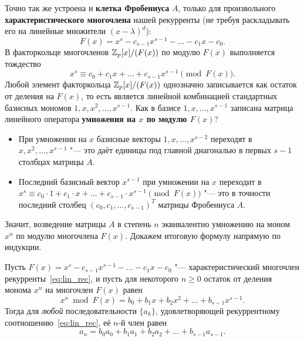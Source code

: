 Точно так же устроена и \textbf{клетка Фробениуса} $A$, только для произвольного \textbf{характеристического многочлена} нашей рекурренты (не требуя раскладывать его на линейные множители $(x - \lambda)^d$):
\[
    F(x) = x^s - c_{s-1} x^{s-1} - \dots - c_1 x - c_0.
\]
В факторкольце многочленов $\mathbb{Z}_p[x] / (F(x))$ по модулю $F(x)$ выполняется тождество
\[
    x^s \equiv c_0 + c_1 x + \dots + c_{s-1} x^{s-1} \pmod{F(x)}.
\]
Любой элемент факторкольца $\mathbb{Z}_p[x] / (F(x))$ однозначно записывается как остаток от деления на $F(x)$, то есть является линейной комбинацией стандартных базисных мономов $1, x, x^2, \dots, x^{s-1}$. Как в базисе $1, x, \dots, x^{s-1}$ записана матрица линейного оператора \textbf{умножения на $x$ по модулю $F(x)$}?
\begin{itemize}
    \item При умножении на $x$ базисные векторы $1, x, \dots, x^{s-2}$ переходят в $x, x^2, \dots, x^{s-1}$ "--- это даёт единицы под главной диагональю в первых $s-1$ столбцах матрицы $A$.
    \item Последний базисный вектор $x^{s-1}$ при умножении на $x$ переходит в $x^s \equiv c_0 \cdot 1 + c_1 \cdot x + \dots + c_{s-1} \cdot x^{s-1} \pmod{F(x)}$ "--- это в точности последний столбец $(c_0, c_1, \dots, c_{s-1})^T$ матрицы Фробениуса $A$.
\end{itemize}
Значит, возведение матрицы $A$ в степень $n$ эквивалентно умножению на моном $x^n$ по модулю многочлена $F(x)$. Докажем итоговую формулу напрямую по индукции.

\begin{theorem}
    Пусть $F(x) = x^s - c_{s-1} x^{s-1} - \dots - c_1 x - c_0$ "--- характеристический многочлен рекурренты~\eqref{eq:lin_rec}, и пусть для некоторого $n \ge 0$ остаток от деления монома $x^n$ на многочлен $F(x)$ равен
    \[
        x^n \bmod F(x) = b_0 + b_1 x + b_2 x^2 + \dots + b_{s-1} x^{s-1}.
    \]
    Тогда для \emph{любой} последовательности $\{a_k\}$, удовлетворяющей рекуррентному соотношению~\eqref{eq:lin_rec}, её $n$-й член равен
    \begin{equation}\label{eq:lin_rec_ans}
        a_n = b_0 a_0 + b_1 a_1 + b_2 a_2 + \dots + b_{s-1} a_{s-1}.
    \end{equation}
\end{theorem}

